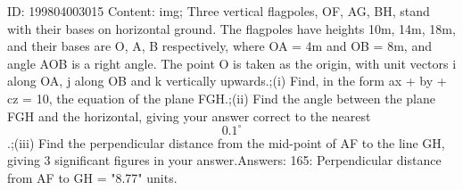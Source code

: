 \documentclass{article}
\begin{document}
ID: 199804003015
Content:
img; Three vertical flagpoles, OF, AG, BH, stand with their bases on horizontal ground. The flagpoles have heights 10m, 14m, 18m, and their bases are O, A, B respectively, where OA = 4m and OB = 8m, and angle AOB is a right angle. The point O is taken as the origin, with unit vectors i along OA, j along OB and k vertically upwards.;(i) Find, in the form ax + by + cz = 10, the equation of the plane FGH.;(ii) Find the angle between the plane FGH and the horizontal, giving your answer correct to the nearest \[0.1^{\circ}\].;(iii) Find the perpendicular distance from the mid-point of AF to the line GH, giving 3 significant figures in your answer.Answers:
165: Perpendicular distance from AF to GH = "8.77" units.
\end{document}
